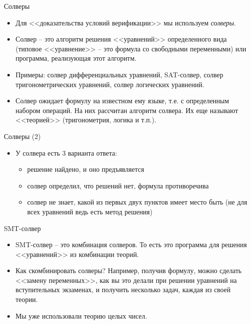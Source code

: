 \documentclass[hyperref={unicode=true}]{beamer}
\begin{document}
    \begin{frame}{Солверы}
    \begin{itemize}
    \item
    Для <<доказательства условий верификации>> мы используем \emph{солверы}.
    \item
    Солвер -- это алгоритм решения <<уравнений>> определенного вида
    (типовое <<уравнение>> -- это формула со свободными переменными)
    или программа, реализующая этот алгоритм.
    \item
    Примеры: солвер дифференциальных уравнений, SAT-солвер,
    солвер тригонометрических уравнений, солвер логических уравнений.
    \item
    Солвер ожидает формулу на известном ему языке, т.е. с определенным
    набором операций. На них рассчитан алгоритм солвера.
    Их еще называют <<теорией>> (тригонометрия, логика и т.п.).
    \end{itemize}
    \end{frame}

    \begin{frame}{Солверы (2)}
    \begin{itemize}
    \item
    У солвера есть 3 варианта ответа:
    \begin{itemize}
    \item решение найдено, и оно предъявляется
    \item солвер определил, что решений нет, формула противоречива
    \item солвер не знает, какой из первых двух пунктов имеет место быть
    (не для всех уравнений ведь есть метод решения)
    \end{itemize}
    \end{itemize}
    \end{frame}

    \begin{frame}{SMT-солвер}
    \begin{itemize}
    \item
    SMT-солвер -- это комбинация солверов. То есть это программа для
    решения <<уравнений>> из комбинации теорий.
    \item
    Как скомбинировать солверы?
    Например, получив формулу, можно сделать <<замену переменных>>, как
    вы это делали при решении уравнений на вступительных экзаменах, и
    получить несколько задач, каждая из своей теории.
    \item
    Мы уже использовали теорию целых чисел.
    \end{itemize}
    \end{frame}
\end{document}
